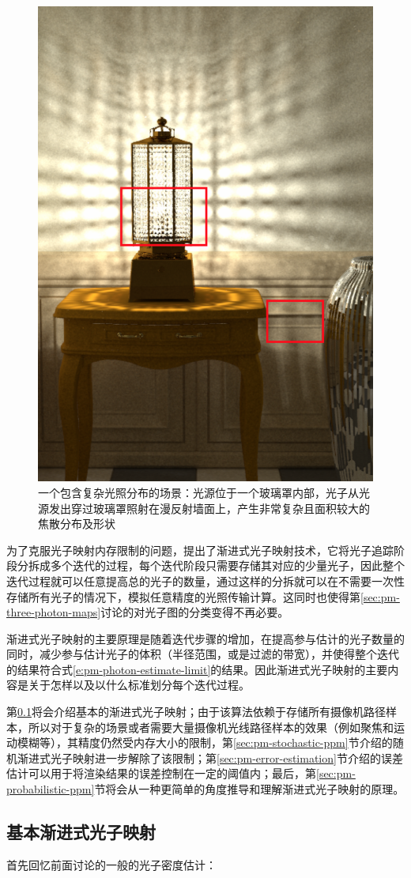 \begin{figure}
\sidecaption
	\includegraphics[width=.35\textwidth]{figures/pm/pm-21}
	\caption{一个包含复杂光照分布的场景：光源位于一个玻璃罩内部，光子从光源发出穿过玻璃罩照射在漫反射墙面上，产生非常复杂且面积较大的焦散分布及形状}
	\label{f:pm-complex-caustics}
\end{figure}

为了克服光子映射内存限制的问题，\cite{a:ProgressivePhotonMapping}提出了渐进式光子映射技术，它将光子追踪阶段分拆成多个迭代的过程，每个迭代阶段只需要存储其对应的少量光子，因此整个迭代过程就可以任意提高总的光子的数量，通过这样的分拆就可以在不需要一次性存储所有光子的情况下，模拟任意精度的光照传输计算。这同时也使得第\ref{sec:pm-three-photon-maps}讨论的对光子图的分类变得不再必要。

渐进式光子映射的主要原理是随着迭代步骤的增加，在提高参与估计的光子数量的同时，减少参与估计光子的体积（半径范围，或是过滤的带宽），并使得整个迭代的结果符合式\ref{e:pm-photon-estimate-limit}的结果。因此渐进式光子映射的主要内容是关于怎样以及以什么标准划分每个迭代过程。

第\ref{sec:pm-basic-ppm}将会介绍基本的渐进式光子映射；由于该算法依赖于存储所有摄像机路径样本，所以对于复杂的场景或者需要大量摄像机光线路径样本的效果（例如聚焦和运动模糊等），其精度仍然受内存大小的限制，第\ref{sec:pm-stochastic-ppm}节介绍的随机渐进式光子映射进一步解除了该限制；第\ref{sec:pm-error-estimation}节介绍的误差估计可以用于将渲染结果的误差控制在一定的阈值内；最后，第\ref{sec:pm-probabilistic-ppm}节将会从一种更简单的角度推导和理解渐进式光子映射的原理。





\subsection{基本渐进式光子映射}\label{sec:pm-basic-ppm}
首先回忆前面讨论的一般的光子密度估计：


